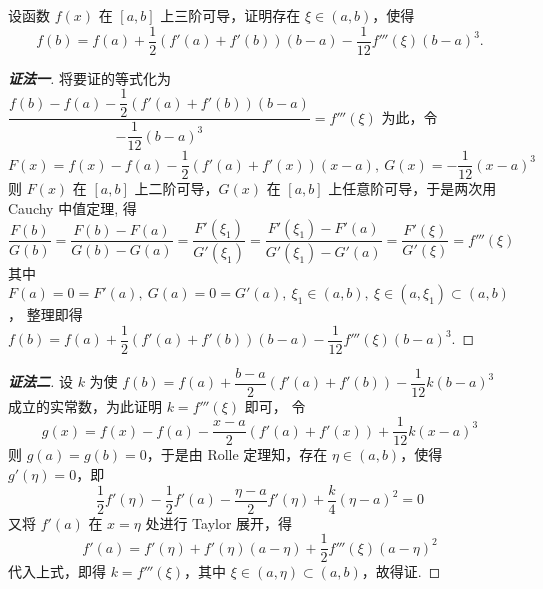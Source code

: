 \begin{example}
    设函数 $f(x)$ 在 $[a,b]$ 上三阶可导，证明存在 $\xi\in(a,b)$，使得 $$f(b)=f(a)+\dfrac{1}{2}(f'(a)+f'(b))(b-a)-\dfrac{1}{12}f'''(\xi)(b-a)^3.$$
\end{example}
\begin{proof}[{\songti \textbf{证法一}}]
    将要证的等式化为 $ \dfrac {f(b)-f(a)-\dfrac {1}{2}(f'(a)+f'(b))(b-a)}{-\dfrac {1}{12}(b-a)^ {3}} =f''' ( \xi)$
    为此，令
    $$F(x)=f(x)-f(a)-\dfrac {1}{2} (f'(a)+f'(x))(x-a),~G(x)=- \dfrac {1}{12} (x-a)^ {3} $$
    则 $F(x)$ 在 $[a,b]$ 上二阶可导，$G(x)$ 在 $[a,b]$ 上任意阶可导，于是两次用 Cauchy 中值定理, 得
    $$\dfrac {F(b)}{G(b)}=\dfrac {F(b)-F(a)}{G(b)-G(a)}=\dfrac {F'(\xi _ {1})}{G'(\xi _ {1})}=\dfrac {F'(\xi _ {1})-F'(a)}{G'(\xi _ {1})-G'(a)}=\dfrac {F'(\xi )}{G'(\xi )}=f'''(\xi) $$
    其中 $F(a)=0=F'(a),~G(a)=0=G'(a),~\xi _{1}\in(a,b),~\xi\in(a,\xi_{1})\subset(a,b)$，
    整理即得 $f(b)=f(a)+\dfrac{1}{2}(f'(a)+f'(b))(b-a)-\dfrac{1}{12}f'''(\xi)(b-a)^3.$
\end{proof}
\begin{proof}[{\songti \textbf{证法二}}]
    设 $k$ 为使 $f(b)=f(a)+\dfrac{b-a}{2}(f'(a)+f'(b))-\dfrac{1}{12}k(b-a)^{3}$ 成立的实常数，为此证明 $k=f'''(\xi)$ 即可，
    令 $$g(x)=f(x)-f(a)-\dfrac{x-a}{2}(f'(a)+f'(x))+\dfrac{1}{12}k(x-a)^{3}$$
    则 $g(a)=g(b)=0$，于是由 Rolle 定理知，存在 $\eta\in(a,b)$，使得 $g'(\eta)=0$，即
    $$\dfrac{1}{2}f'(\eta)-\dfrac{1}{2}f'(a)-\dfrac{\eta-a}{2}f'(\eta)+\dfrac{k}{4}(\eta-a)^{2}=0$$
    又将 $f'(a)$ 在 $x=\eta$ 处进行 Taylor 展开，得
    $$f'(a)=f'(\eta)+f'(\eta)(a-\eta)+\dfrac{1}{2}f'''(\xi)(a-\eta)^{2}$$
    代入上式，即得 $k=f'''(\xi)$，其中 $\xi\in(a,\eta)\subset(a,b)$，故得证.
\end{proof}
